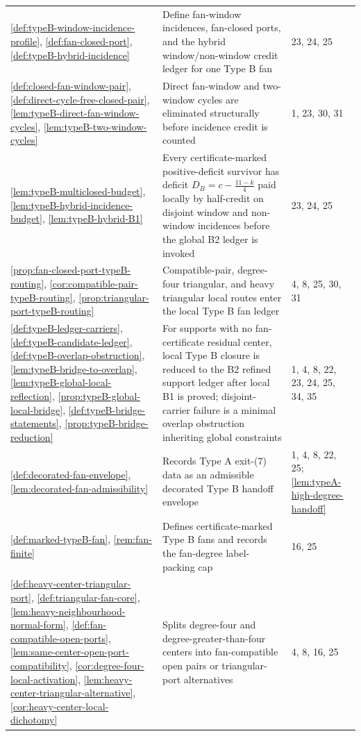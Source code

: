 \documentclass[11pt]{article}
\begin{document}
{\begin{longtable}{L{0.31\textwidth} L{0.42\textwidth} L{0.17\textwidth}}
\cref{def:typeB-window-incidence-profile}, \cref{def:fan-closed-port}, \cref{def:typeB-hybrid-incidence} & Define fan-window incidences, fan-closed ports, and the hybrid window/non-window credit ledger for one Type B fan & 23, 24, 25 \\
\cref{def:closed-fan-window-pair}, \cref{def:direct-cycle-free-closed-pair}, \cref{lem:typeB-direct-fan-window-cycles}, \cref{lem:typeB-two-window-cycles} & Direct fan-window and two-window cycles are eliminated structurally before incidence credit is counted & 1, 23, 30, 31 \\
\cref{lem:typeB-multiclosed-budget}, \cref{lem:typeB-hybrid-incidence-budget}, \cref{lem:typeB-hybrid-B1} & Every certificate-marked positive-deficit survivor has deficit $D_B=c-\frac{11-k}{4}$ paid locally by half-credit on disjoint window and non-window incidences before the global B2 ledger is invoked & 23, 24, 25 \\
\cref{prop:fan-closed-port-typeB-routing}, \cref{cor:compatible-pair-typeB-routing}, \cref{prop:triangular-port-typeB-routing} & Compatible-pair, degree-four triangular, and heavy triangular local routes enter the local Type B fan ledger & 4, 8, 25, 30, 31 \\
\cref{def:typeB-ledger-carriers}, \cref{def:typeB-candidate-ledger}, \cref{def:typeB-overlap-obstruction}, \cref{lem:typeB-bridge-to-overlap}, \cref{lem:typeB-global-local-reflection}, \cref{prop:typeB-global-local-bridge}, \cref{def:typeB-bridge-statements}, \cref{prop:typeB-bridge-reduction} & For supports with no fan-certificate residual center, local Type B closure is reduced to the B2 refined support ledger after local B1 is proved; disjoint-carrier failure is a minimal overlap obstruction inheriting global constraints & 1, 4, 8, 22, 23, 24, 25, 34, 35 \\
\cref{def:decorated-fan-envelope}, \cref{lem:decorated-fan-admissibility} & Records Type A exit-(7) data as an admissible decorated Type B handoff envelope & 1, 4, 8, 22, 25; \cref{lem:typeA-high-degree-handoff} \\
\cref{def:marked-typeB-fan}, \cref{rem:fan-finite} & Defines certificate-marked Type B fans and records the fan-degree label-packing cap & 16, 25 \\
\cref{def:heavy-center-triangular-port}, \cref{def:triangular-fan-core}, \cref{lem:heavy-neighbourhood-normal-form}, \cref{def:fan-compatible-open-ports}, \cref{lem:same-center-open-port-compatibility}, \cref{cor:degree-four-local-activation}, \cref{lem:heavy-center-triangular-alternative}, \cref{cor:heavy-center-local-dichotomy} & Splits degree-four and degree-greater-than-four centers into fan-compatible open pairs or triangular-port alternatives & 4, 8, 16, 25 \\

\end{longtable}}
\end{document}
